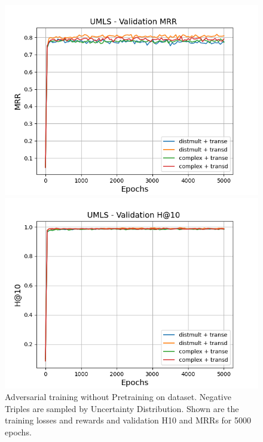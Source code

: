 \begin{figure}
    \begin{minipage}{.5\textwidth}
      \centering
      \includegraphics[width=0.9\linewidth]{figures/results/gan_train/not_pretrained/uncertainty/max_distribution/entropy/umls/gan_train_uncertainty_umls_mrrs.png}
    \end{minipage}%
    \begin{minipage}{.5\textwidth}
      \centering
      \includegraphics[width=0.9\linewidth]{figures/results/gan_train/not_pretrained/uncertainty/max_distribution/entropy/umls/gan_train_uncertainty_umls_hit10s.png}
    \end{minipage}%
    \caption{Adversarial training without Pretraining on \umls dataset. 
    Negative Triples are sampled by Uncertainty Distribution.
    Shown are the training losses and rewards and validation H\@10 and MRRs for 5000 epochs.}
    \label{fig:advtrain_not_pretrained_umls_pretrained}
\end{figure}




